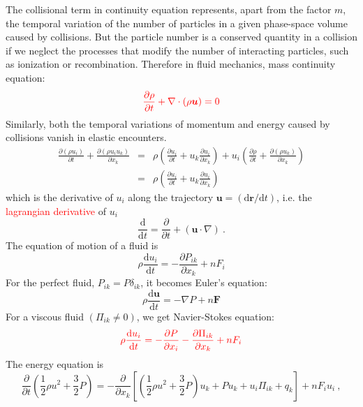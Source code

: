\documentclass[12pt,a4paper]{article}
\renewcommand{\vec}[1]{\boldsymbol{#1}}
\newcommand{\dif}{\mathrm{d}}
\begin{document}
The collisional term in continuity equation represents, apart from the factor $m$, the temporal variation of the number of particles in a given phase-space volume caused by collisions. But the particle number is a conserved quantity in a collision if we neglect the processes that modify the number of interacting particles, such as ionization or recombination. Therefore in fluid mechanics, mass continuity equation:
\begin{equation}
\color{red} \frac{\partial \rho}{\partial t} +\nabla \cdot (\rho \vec{u}) = 0
\label{conti}
\end{equation}
Similarly, both the temporal variations of momentum and energy caused by collisions vanish in elastic encounters.
\begin{eqnarray*}
\frac{\partial (\rho u_i)}{\partial t} + \frac{\partial (\rho u_iu_k)}{\partial x_k} &=& \rho \left(\frac{\partial u_i}{\partial t} +u_k \frac{\partial u_i}{\partial x_k}\right) + u_i\left(\frac{\partial \rho}{\partial t} +\frac{\partial (\rho u_k)}{\partial x_k}\right) \\
&=& \rho \left(\frac{\partial u_i}{\partial t} +u_k \frac{\partial u_i}{\partial x_k}\right)
\end{eqnarray*}
which is the derivative of $u_i$ along the trajectory $\vec{u} = (\dif \vec{r}/\dif t)$, i.e. the \textcolor{red}{lagrangian derivative} of $u_i$
\begin{equation*}
\frac{\dif }{\dif t}  = \frac{\partial }{\partial t}  +(\vec{u}\cdot \nabla) ~.
\end{equation*}
The equation of motion of a fluid is
\begin{equation}
\rho \frac{\dif u_i}{\dif t}  = -\frac{\partial P_{ik} }{\partial x_k}  + nF_i
\end{equation}
For the perfect fluid, $P_{ik} = P\delta_{ik}$, it becomes Euler's equation:
\begin{equation}
\rho \frac{\dif \vec{u}}{\dif t}  = -\nabla P  + n\vec{F}
\end{equation}
For a viscous fluid $(\Pi_{ik} \neq 0)$, we get Navier-Stokes equation:
\begin{equation}
\color{red} \rho \frac{\dif u_i}{\dif t}  = -\frac{\partial P}{\partial x_i}  -\frac{\partial \Pi_{ik}}{\partial x_k}+ nF_i
\label{NS_equ}
\end{equation}
The energy equation is
\begin{equation}
\frac{\partial}{\partial t} \left(\frac{1}{2}\rho u^2 +\frac{3}{2}P \right) = -\frac{\partial}{\partial x_k} \left[\left(\frac{1}{2}\rho u^2 +\frac{3}{2}P \right)u_k + Pu_k + u_i\Pi_{ik} +q_k \right] +nF_i u_i ~,
\end{equation}
\end{document}
